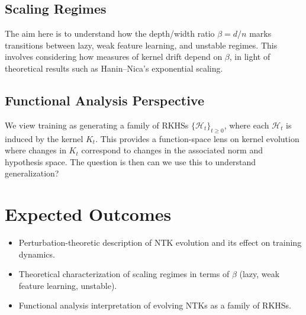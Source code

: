 \documentclass[11pt,a4paper]{article}
\begin{document}
\subsection{Scaling Regimes}
The aim here is to understand how the depth/width ratio $\beta = d/n$ marks
transitions between lazy, weak feature learning, and unstable regimes. This
involves considering how measures of kernel drift depend on $\beta$, in light
of theoretical results such as Hanin--Nica’s exponential scaling.
%

\subsection{Functional Analysis Perspective}
We view training as generating a family of RKHSs $\{\mathcal H_t\}_{t\ge 0}$,
where each $\mathcal H_t$ is induced by the kernel $K_t$. This provides a
function-space lens on kernel evolution where changes in $K_t$ correspond to changes
in the associated norm and hypothesis space. The question is then can we use this
to understand generalization?
%

\section{Expected Outcomes}
\begin{itemize}
	\item Perturbation-theoretic description of NTK evolution and its effect on
	      training dynamics.
	\item Theoretical characterization of scaling regimes in terms of $\beta$
	      (lazy, weak feature learning, unstable).
	\item Functional analysis interpretation of evolving NTKs as a family of RKHSs.
\end{itemize}
\end{document}
